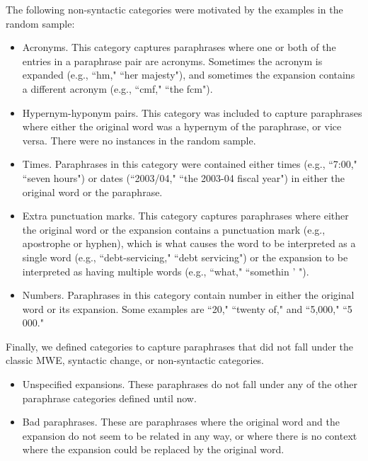\documentclass[11pt]{article}
\begin{document}
The following non-syntactic categories were motivated by the examples in the random sample:

\begin{itemize}

\item Acronyms. This category captures paraphrases where one or both of the entries in a paraphrase pair are acronyms. Sometimes the acronym is expanded (e.g., ``hm," ``her majesty"), and sometimes the expansion contains a different acronym (e.g., ``cmf," ``the fcm").

\item Hypernym-hyponym pairs. This category was included to capture paraphrases where either the original word was a hypernym of the paraphrase, or vice versa. There were no instances in the random sample.

\item Times. Paraphrases in this category were contained either times (e.g., ``7:00," ``seven hours") or dates (``2003/04," ``the 2003-04 fiscal year") in either the original word or the paraphrase.

\item  Extra punctuation marks. This category captures paraphrases where either the original word or the expansion contains a punctuation mark (e.g., apostrophe or hyphen), which is what causes the word to be interpreted as a single word (e.g., ``debt-servicing," ``debt servicing") or the expansion to be interpreted as having multiple words (e.g., ``what," ``somethin ' ").

\item Numbers. Paraphrases in this category contain number in either the original word or its expansion. Some examples are ``20," ``twenty of," and ``5,000," ``5 000."

\end{itemize}

Finally, we defined categories to capture paraphrases that did not fall under the classic MWE, syntactic change, or non-syntactic categories.
\begin{itemize}
\item Unspecified expansions. These paraphrases do not fall under any of the other paraphrase categories defined until now. 

\item Bad paraphrases. These are paraphrases where the original word and the expansion do not seem to be related in any way, or where there is no context where the expansion could be replaced by the original word. 
\end{itemize}
\end{document}

